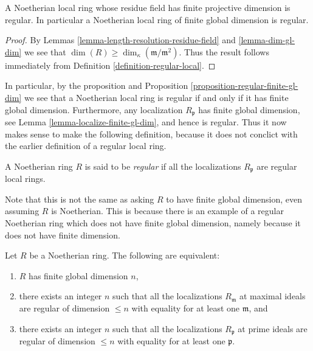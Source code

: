 \begin{proposition}
\label{proposition-finite-gl-dim-regular}
A Noetherian local ring whose residue field
has finite projective dimension is regular.
In particular a Noetherian local ring of
finite global dimension is regular.
\end{proposition}

\begin{proof}
By Lemmas \ref{lemma-length-resolution-residue-field}
and \ref{lemma-dim-gl-dim} we see that
$\dim(R) \geq \dim_\kappa(\mathfrak m /\mathfrak m^2)$. 
Thus the result follows immediately from Definition
\ref{definition-regular-local}.
\end{proof}

\noindent
In particular, by the proposition and
Proposition \ref{proposition-regular-finite-gl-dim}
we see that
a Noetherian local ring is regular if and only if
it has finite global dimension. Furthermore, any localization
$R_{\mathfrak p}$ has finite global dimension,
see Lemma \ref{lemma-localize-finite-gl-dim},
and hence is regular. Thus it now
makes sense to make the following definition,
because it does not conclict with the earlier
definition of a regular local ring.

\begin{definition}
\label{definition-regular}
A Noetherian ring $R$ is said to be {\it regular}
if all the localizations $R_{\mathfrak p}$ are
regular local rings.
\end{definition}

\noindent
Note that this is not the same as asking $R$ to have finite
global dimension, even assuming $R$ is Noetherian. This is
because there is an example of a regular Noetherian ring
which does not have finite global dimension, namely because
it does not have finite dimension.

\begin{lemma}
\label{lemma-finite-gl-dim-finite-dim-regular}
Let $R$ be a Noetherian ring.
The following are equivalent:
\begin{enumerate}
\item $R$ has finite global dimension $n$,
\item there exists an integer $n$ such that
all the localizations $R_{\mathfrak m}$ at maximal ideals
are regular of dimension $\leq n$ with equality for at least
one $\mathfrak m$, and
\item there exists an integer $n$ such that
all the localizations $R_{\mathfrak p}$ at prime ideals
are regular of dimension $\leq n$ with equality for at least
one $\mathfrak p$.
\end{enumerate}
\end{lemma}

